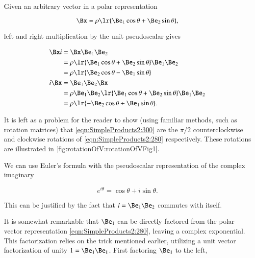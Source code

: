 Given an arbitrary vector in a polar representation

\begin{dmath}\label{eqn:SimpleProducts2:280}
   \Bx = \rho \lr{ \Be_1 \cos\theta + \Be_2 \sin\theta },
\end{dmath}

left and right multiplication by the unit pseudoscalar gives

\begin{dmath}\label{eqn:SimpleProducts2:300}
\begin{aligned}
\Bx i
&= \Bx \Be_1 \Be_2 \\
&= \rho \lr{ \Be_1 \cos\theta + \Be_2 \sin\theta } \Be_1 \Be_2 \\
&= \rho \lr{ \Be_2 \cos\theta - \Be_1 \sin\theta } \\
i \Bx &= \Be_1 \Be_2 \Bx \\
&= \rho \Be_1 \Be_2 \lr{ \Be_1 \cos\theta + \Be_2 \sin\theta } \Be_1 \Be_2 \\
&= \rho \lr{ -\Be_2 \cos\theta + \Be_1 \sin\theta }.
\end{aligned}
\end{dmath}

It is left as a problem for the reader to show (using familiar methods, such as rotation matrices)
that \cref{eqn:SimpleProducts2:300} are the \( \pi/2 \) counterclockwise and clockwise rotations of \cref{eqn:SimpleProducts2:280} respectively.  These rotations are illustrated in \cref{fig:rotationOfV:rotationOfVFig1}.


We can use Euler's formula with the  pseudoscalar representation of the complex imaginary

\begin{dmath}\label{eqn:SimpleProducts2:340}
e^{i \theta} = \cos\theta + i \sin\theta.
\end{dmath}

This can be justified by the fact that \( i = \Be_1 \Be_2 \) commutes with itself.

It is somewhat remarkable that \( \Be_1 \) can be directly factored from the
polar vector representation \cref{eqn:SimpleProducts2:280}, leaving a complex exponential.
This factorization relies on the trick mentioned earlier, utilizing a unit vector factorization of unity
\( 1 = \Be_1 \Be_1 \).  First factoring \( \Be_1 \) to the left,

